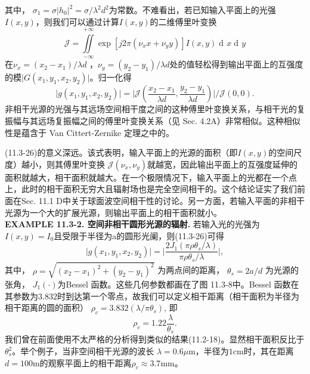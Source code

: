 \documentclass[UTF8]{ctexart}
\newcommand\crule[3][black]{\textcolor{#1}{\rule{#2}{#3}}}
\numberwithin{figure}{subsection}
\numberwithin{table}{subsection}
\DeclareMathOperator\dif{d\!}
\begin{document}
其中， $\sigma_1 = \sigma \lvert h_0 \rvert ^2 = \sigma / \lambda ^2 d^2$为常数。不难看出，若已知输入平面上的光强$I(x,y)$，则我们可以通过计算$I(x,y)$的二维傅里叶变换
\begin{equation}
\mathcal{J} = \iint\limits_{-\infty}^{+\infty}\exp [j2\pi (\nu_x x+ \nu_y y)] I(x,y) \dif x \dif y
\end{equation}
在$\nu_x = (x_2 - x_1) / \lambda d$ ，$\nu_y = (y_2 - y_1) / \lambda d$处的值轻松得到输出平面上的互强度的模$\lvert G(x_1, y_1, x_2, y_2) \rvert$。归一化得
\begin{equation}
\lvert g(x_1, y_1, x_2, y_2) \rvert = \bigg\lvert \mathcal{J}(\frac{x_2 - x_1}{\lambda d}, \frac{y_2 - y_1}{\lambda d}) \bigg\rvert / \mathcal{J}(0, 0) .
\end{equation}
非相干光源的光强与其远场空间相干度之间的这种傅里叶变换关系，与相干光的复振幅与其远场复振幅之间的傅里叶变换关系（见 Sec. 4.2A）非常相似。这种相似性是蕴含于 Van Cittert-Zernike 定理之中的。
\par (11.3-26)的意义深远。该式表明，输入平面上的光源的面积（即$I(x,y)$的空间尺度）越小，则其傅里叶变换 $\mathcal{J}(\nu_x, \nu_y)$就越宽，因此输出平面上的互强度延伸的面积就越大，相干面积就越大。在一个极限情况下，输入平面上的光都在一个点上，此时的相干面积无穷大且辐射场也是完全空间相干的。这个结论证实了我们前面在Sec. 11.1 D中关于球面波空间相干性的讨论。另一方面，若输入平面的非相干光源为一个大的扩展光源，则输出平面上的相干面积就小。\\
\noindent{\crule[ksc]{\textwidth}{0.1cm}}
\textbf{EXAMPLE 11.3-2. 空间非相干圆形光源的辐射.} 若输入光的光强为$I(x,y) = I_0$且受限于半径为a的圆形光阑，则(11.3-26)可得
\begin{equation}
\lvert g(x_1, y_1, x_2, y_2) \rvert = \bigg\lvert \frac{2J_1(\pi\rho\theta_s / \lambda)}{\pi\rho\theta_s / \lambda} \bigg\rvert ,
\end{equation}
其中， $\rho = \sqrt{(x_2 - x_1)^2 + (y_2 - y_1)^2}$ 为两点间的距离， $\theta_s = 2a / d$ 为光源的张角， $J_1 (\cdot)$为Bessel 函数。这些几何参数都画在了图 11.3-8中。Bessel 函数在其参数为$3.832$时到达第一个零点，故我们可以定义相干距离（相干面积为半径为相干距离的圆的面积） $\rho_c = 3.832(\lambda / \pi\theta_s)$, 即
\begin{equation}
\rho_c = 1.22 \frac{\lambda}{\theta_s} .
\end{equation}
我们曾在前面使用不太严格的分析得到类似的结果(11.2-18)。显然相干面积反比于$\theta_s^2$。举个例子，当非空间相干光源的波长 $\lambda = 0.6 \mu$m，半径为$1$cm时，其在距离$d = 100$m的观察平面上的相干距离$\rho_c \approx 3.7$mm。
\end{document}
